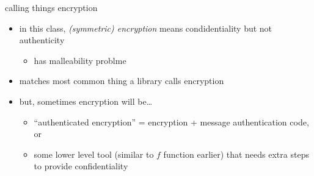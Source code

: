 \begin{frame}{calling things encryption}
    \begin{itemize}
    \item in this class, \textit{(symmetric) encryption} means condidentiality but not authenticity
        \begin{itemize}
        \item has malleability problme
        \end{itemize}
    \item matches most common thing a library calls encryption
    \vspace{.5cm}
    \item but, sometimes encryption will be\ldots
        \begin{itemize}
        \item ``authenticated encryption'' = encryption + message authentication code, or
        \item some lower level tool (similar to $f$ function earlier) that needs extra steps to provide confidentiality
        \end{itemize}
    \end{itemize}
\end{frame}
